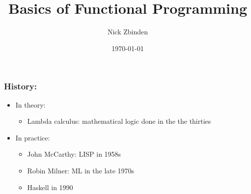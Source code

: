 \documentclass{beamer}
\begin{document}
\title{Basics of Functional Programming}
\author{Nick Zbinden}
\date{\today}

\begin{frame}
\titlepage
\end{frame}

\begin{frame}\frametitle{History: }
\begin{itemize}
	\item In theory: \pause 
	\begin{itemize}
		\item Lambda calculus: mathematical logic done in the the thirties \pause
	\end{itemize}

	\item In practice:  \pause
	\begin{itemize}
		\item John McCarthy: LISP in 1958s \pause
		\item Robin Milner: ML in the late 1970s \pause
		\item Haskell in  1990 \pause
	\end{itemize}
\end{itemize}
\end{frame}
\end{document}
